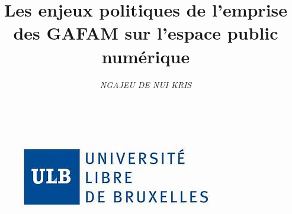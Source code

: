 \documentclass[12pt,a4paper]{article} %
\title {\textbf {Les enjeux politiques de l’emprise des GAFAM sur l’espace public numérique }} %
\author{\textit{NGAJEU DE NUI KRIS}} %
\date{} %
\begin{document}
	
	\maketitle %
	
	
	\begin{figure}[h]
		\centering
		\includegraphics[scale=1]{ulb}
	\end{figure}
	
	
	\tableofcontents %
	
\end{document}
